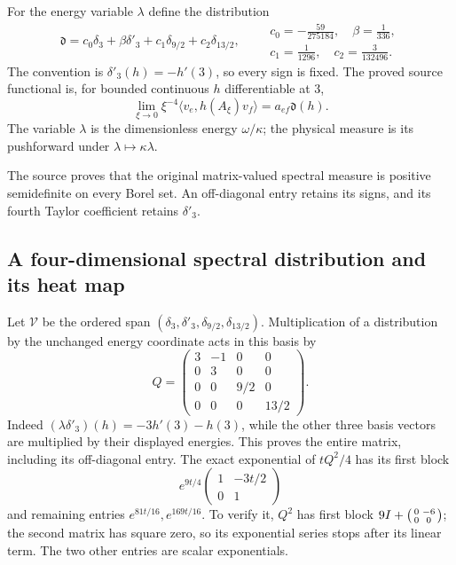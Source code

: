 For the energy variable $\lambda$ define the distribution
\begin{equation}
\mathfrak d=c_0\delta_3+\beta\delta'_3+
                  c_1\delta_{9/2}+c_2\delta_{13/2},\qquad
\begin{gathered}
c_0=-\frac{59}{275184},\quad\beta=\frac1{336},\\
c_1=\frac1{1296},\quad c_2=\frac3{132496}.
\end{gathered}
\label{x4:distribution}
\end{equation}
The convention is $\delta'_3(h)=-h'(3)$, so every sign is fixed.
The proved source functional is, for bounded continuous $h$ differentiable
at $3$,
\begin{equation}
\lim_{\xi\to0}\xi^{-4}\langle v_e,h(A_\xi)v_f\rangle
                       =a_{ef}\mathfrak d(h).
\label{x4:source-functional}
\end{equation}
The variable $\lambda$ is the dimensionless energy $\omega/\kappa$;
the physical measure is its pushforward under $\lambda\mapsto\kappa\lambda$.

The source proves that the original matrix-valued spectral measure is
positive semidefinite on every Borel set. An off-diagonal entry retains
its signs, and its fourth Taylor coefficient retains $\delta'_3$.

\subsection{A four-dimensional spectral distribution and its heat map}

Let $\mathcal V$ be the ordered span
$(\delta_3,\delta'_3,\delta_{9/2},\delta_{13/2})$.
Multiplication of a distribution by the unchanged energy coordinate
acts in this basis by
\begin{equation}
Q=\begin{pmatrix}
3&-1&0&0\\0&3&0&0\\0&0&9/2&0\\0&0&0&13/2
\end{pmatrix}.
\label{x4:energy-matrix}
\end{equation}
Indeed $(\lambda\delta'_3)(h)=-3h'(3)-h(3)$, while the other
three basis vectors are multiplied by their displayed energies. This
proves the entire matrix, including its off-diagonal entry. The exact
exponential of $tQ^2/4$ has its first block
\[
e^{9t/4}\begin{pmatrix}1&-3t/2\\0&1\end{pmatrix}
\]
and remaining entries $e^{81t/16},e^{169t/16}$. To verify it,
$Q^2$ has first block $9I+\begin{psmallmatrix}0&-6\\0&0\end{psmallmatrix}$;
the second matrix has square zero, so its exponential series stops after
its linear term. The two other entries are scalar exponentials.

